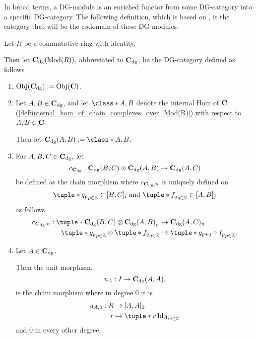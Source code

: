 In broad terms, a DG-module is an enriched functor from some DG-category into a specific DG-category. The following definition, which is based on \cite[p.\ 29]{Jasso-Muro_2023}, is the category that will be the codomain of these DG-modules.

\begin{definition}[\( \C_{\dg} \)]
    \label{def:c_dg_mod_r}
    Let \( R \) be a commutative ring with identity.

    Then let \emph{\( \operatorname{\mathbf{C}}_{\operatorname{dg}}(\operatorname{Mod}(R)) \)}, abbreviated to \emph{\( \C_{\dg} \)}, be the DG-category defined as follows
    \begin{enumerate}
        \item {
            \( \operatorname{Obj}(\operatorname{\mathbf{C}}_{\operatorname{dg}}) := \operatorname{Obj}(\operatorname{\mathbf{C}}) \).
        }
        \item {
            Let \( A, B \in \operatorname{\mathbf{C}}_{\operatorname{dg}} \), and let \( \class*{A, B} \) denote the internal Hom of \( \operatorname{\mathbf{C}} \) (\autoref{def:internal_hom_of_chain_complexes_over_Mod(R)}) with respect to \( A, B \in \operatorname{\mathbf{C}} \).

            Then let \( \C_{\dg}(A, B) := \class*{A, B} \).
        }
        \item {
            For \( A, B, C \in \operatorname{\mathbf{C}}_{\operatorname{dg}} \), let
            \[
                c_{\operatorname{\mathbf{C}}_{\operatorname{dg}}}: \operatorname{\mathbf{C}}_{\operatorname{dg}}(B, C) \otimes \operatorname{\mathbf{C}}_{\operatorname{dg}}(A, B) \to \operatorname{\mathbf{C}}_{\operatorname{dg}}(A, C)
            \]
            be defined as the chain morphism where \( c_{\operatorname{\mathbf{C}}_{\operatorname{dg}}, n} \) is uniquely defined on
            \[
                \tuple*{g_p}_{p \in \Zb} \in [B, C]_i \text{ and } \tuple*{f_q}_{q \in \Zb} \in [A, B]_j
            \]
            as follows
            \begin{align*}
                c_{\C_{\dg}, n}: \tuple*{ \C_{\dg}(B, C) \otimes \C_{\dg}(A, B) }_n &\to \C_{\dg}(A, C)_n \\
                \tuple*{g_p}_{p \in \Zb} \otimes \tuple*{f_q}_{q \in \Zb} &\mapsto \tuple*{g_{p + j} \circ f_p}_{p \in \Zb}.
            \end{align*}
        }
        \item {
            Let \( A \in \operatorname{\mathbf{C}}_{\operatorname{dg}} \).

            Then the unit morphism,
            \[
                u_A: I \to \operatorname{\mathbf{C}}_{\operatorname{dg}}(A, A),
            \]
            is the chain morphism where in degree \( 0 \) it is
            \begin{align*}
                u_{A, 0} : R &\to [A, A]_0 \\
                r &\mapsto \tuple*{r\Id_{A_i}}_{i \in \Zb}
            \end{align*}
            and \( 0 \) in every other degree.
        }
    \end{enumerate}
\end{definition}


